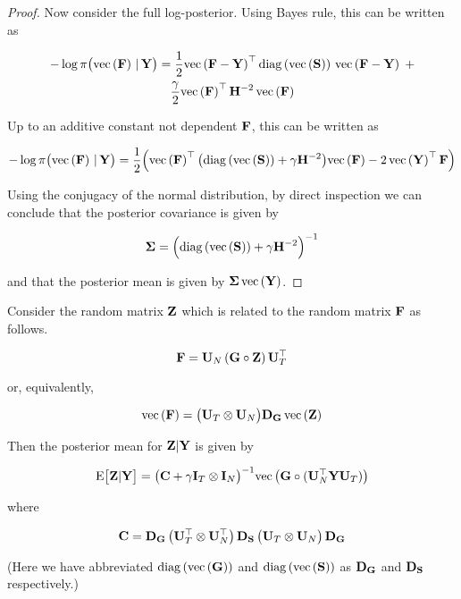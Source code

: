 \begin{proof}
    Now consider the full log-posterior. Using Bayes rule, this can be written as 

    \begin{multline}
        -\log \pi\big(\vecc{\F} \, | \, \Y \big) = \frac{1}{2} \vecc{\F - \Y}^\top \diag{\vecc{\Ss}} \, \vecc{\F - \Y} \; + \\ \frac{\gamma}{2} \vecc{\F }^\top\HH^{-2} \, \vecc{\F}
    \end{multline}

    Up to an additive constant not dependent $\F$, this can be written as 

    \begin{equation}
        -\log \pi\big(\vecc{\F} \, | \, \Y \big) = \frac{1}{2} \Big( \vecc{\F}^\top \big( \diag{\vecc{\Ss}} + \gamma \HH^{-2}\big) \vecc{\F} - 2 \, \vecc{\Y}^\top \F \Big)
    \end{equation}

    Using the conjugacy of the normal distribution, by direct inspection we can conclude that the posterior covariance is given by 

    \begin{equation}
        \SIG = \Big( \diag{\vecc{\Ss}} + \gamma \HH^{-2} \Big)^{-1}
    \end{equation}

    and that the posterior mean is given by $\SIG \, \vecc{\Y}$. 

\end{proof}


\begin{theorem}
    \label{the:Z_transform_bayes}

    \normalfont
    
    Consider the random matrix $\Z$ which is related to the random matrix $\F$ as follows. 
    
    $$
    \F = \U_N \, (\G \circ \Z) \, \U_T^\top 
    $$
    
    \noindent or, equivalently,
    
    $$
    \vecc{\F} = \big(\U_T \otimes \U_N\big) \D_\G \, \vecc{\Z}
    $$
    
    Then the posterior mean for $\Z | \Y$ is given by 
    
    $$
    \text{E}\big[\Z | \Y \big] = \big( \C + \gamma \I_T \otimes \I_N \big)^{-1}\vecc{\G \circ (\U_N^\top \Y \U_T)} 
    $$
    
    \noindent where
    
    $$
    \C = \D_{\G} \, \big(\U_T^\top \otimes \U_N^\top \big)\, \D_{\Ss} \, \big(\U_T \otimes \U_N \big) \,\D_{\G}
    $$
    
    (Here we have abbreviated $\diag{\vecc{\G}}$ and $\diag{\vecc{\Ss}}$ as $\D_{\G}$ and $\D_{\Ss}$ respectively.)
    
    \end{theorem}
    
